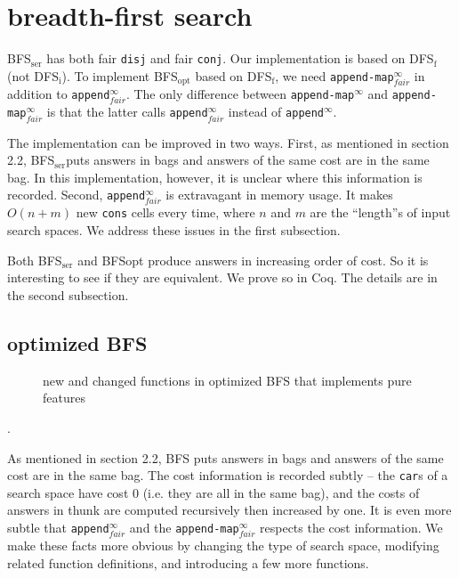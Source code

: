 \documentclass[format=acmlarge, review=true, authordraft=true]{acmart}
\newcommand{\conj}{\texttt{conj}}
\newcommand{\disj}{\texttt{disj}}
\newcommand{\DFSf }[0]{DFS$_\textrm{f}$}
\newcommand{\BFSopt}[0]{BFS$_\textrm{opt}$}
\newcommand{\BFSser}[0]{BFS$_\textrm{ser}$}
\begin{document}

\section{breadth-first search}

\BFSser{} has both fair \disj{} and fair \conj{}. Our implementation is based on 
DFS$_\textrm{f}$ (not DFS$_\textrm{i}$). To implement \BFSopt{} based on \DFSf{}, 
we need \texttt{append-map$^\infty_{fair}$} in addition to 
\texttt{append$^\infty_{fair}$}. 
The only difference between \texttt{append-map$^\infty$} and 
\texttt{append-map$^\infty_{fair}$} is that the latter calls 
\texttt{append$^\infty_{fair}$} instead of \texttt{append$^\infty$}.

The implementation can be improved in two ways. First, as mentioned in 
section 2.2, \BFSser puts answers in bags and answers of the same cost are in the 
same bag. In this implementation, however, it is unclear where this information 
is recorded. Second, \texttt{append$^\infty_{fair}$} is extravagant in memory 
usage. It 
makes $O(n+m)$ new \texttt{cons} cells every time, where $n$ and $m$ are the 
``length''s of input search spaces. We address these issues in the first 
subsection.

Both \BFSser{} \citet{seres1999algebra} and BFSopt{} produce answers in 
increasing order of cost. So it is interesting to see if they are equivalent. 
We prove so in Coq. The details are in the second subsection.

\subsection{optimized BFS}

\begin{figure}
		
	\caption{new and changed functions in optimized BFS that implements pure 
	features}
	\label{BFS-opt}
\end{figure}

.

As mentioned in section 2.2, BFS puts answers in bags and answers of the 
same cost are in the same bag. The cost
information is recorded subtly -- the \texttt{car}s of a search space have cost 
0 (i.e. they are all in the same bag), and the costs of answers in thunk are 
computed recursively then increased by one. It is even more subtle that
\texttt{append$^\infty_{fair}$} and the \texttt{append-map$^\infty_{fair}$} 
respects the cost information. We make these facts more obvious by 
changing the type of search space, modifying related function definitions, 
and introducing a few more functions.
\end{document}
